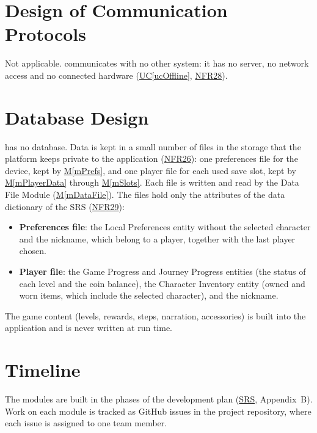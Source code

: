 \documentclass[12pt, titlepage]{article}
\newcommand{\uref}[1]{\hyperref[#1]{UC\ref*{#1}}}
\newcommand{\mref}[1]{\hyperref[#1]{M\ref*{#1}}}
\newcommand{\srsurl}{https://team-hindsight.github.io/ophthamology-game/SRS/SRS.pdf}
\newcommand{\srsdoc}[1]{\href{\srsurl}{#1}}
\newcommand{\srsnfrref}[2]{\href{\srsurl\#nameddest=#1}{NFR#2}}
\begin{document}
\section{Design of Communication Protocols}

Not applicable. \progname{} communicates with no other system: it has no
server, no network access and no connected hardware (\uref{ucOffline},
\srsnfrref{NFR_Privacy}{28}).

\section{Database Design}

\progname{} has no database. Data is kept in a small number of files in the
storage that the platform keeps private to the application
(\srsnfrref{NFR_DataProtection}{26}): one preferences file for the device, kept
by \mref{mPrefs}, and one player file for each used save slot, kept by
\mref{mPlayerData} through \mref{mSlots}. Each file is written and read by the
Data File Module (\mref{mDataFile}). The files hold only the attributes of the
data dictionary of the SRS (\srsnfrref{NFR_Minimization}{29}):

\begin{itemize}
\item \textbf{Preferences file}: the Local Preferences entity without the
  selected character and the nickname, which belong to a player, together with
  the last player chosen.
\item \textbf{Player file}: the Game Progress and Journey Progress entities
  (the status of each level and the coin balance), the Character Inventory
  entity (owned and worn items, which include the selected character), and the
  nickname.
\end{itemize}

The game content (levels, rewards, steps, narration, accessories) is built into
the application and is never written at run time.

\section{Timeline} \label{SecTimeline}

The modules are built in the phases of the development plan
(\srsdoc{SRS}, Appendix~B). Work on each module is tracked as GitHub issues in
the project repository, where each issue is assigned to one team member.
\end{document}
